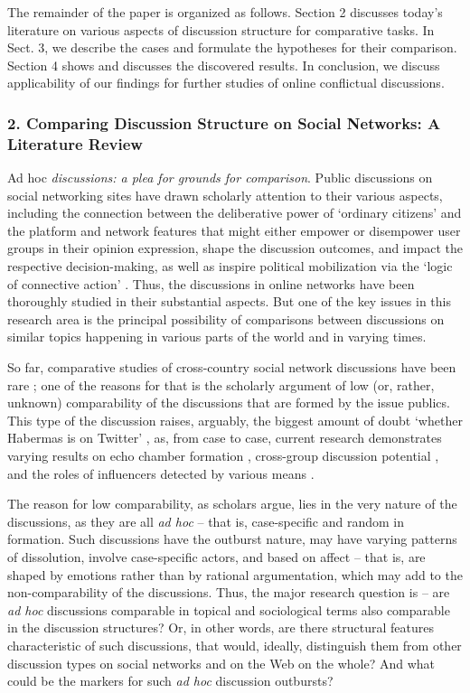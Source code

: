 The remainder of the paper is organized as follows. Section 2 discusses today’s literature on various aspects of discussion structure for comparative tasks. In Sect. 3, we describe the cases and formulate the hypotheses for their comparison. Section 4 shows and discusses the discovered results. In conclusion, we discuss applicability of our findings for further studies of online conflictual discussions.

\subsubsection{2. Comparing Discussion Structure on Social Networks: A Literature Review}

Ad hoc \textit{discussions: a plea for grounds for comparison}. Public discussions on social networking sites have drawn scholarly attention to their various aspects, including the connection between the deliberative power of ‘ordinary citizens’ and the platform and network features that might either empower or disempower user groups in their opinion expression, shape the discussion outcomes, and impact the respective decision-making, as well as inspire political mobilization via the ‘logic of connective action’ \cite{BennettSegerberg}. Thus, the discussions in online networks have been thoroughly studied in their substantial aspects. But one of the key issues in this research area is the principal possibility of comparisons between discussions on similar topics happening in various parts of the world and in varying times.

So far, comparative studies of cross-country social network discussions have been rare \cite{BodrunovaLitvinenkoBlekanov2017}; one of the reasons for that is the scholarly argument of low (or, rather, unknown) comparability of the discussions that are formed by the issue publics. This type of the discussion raises, arguably, the biggest amount of doubt ‘whether Habermas is on Twitter’ \cite{BrunsHighfeld2016}, as, from case to case, current research demonstrates varying results on echo chamber formation \cite{BastosMerceaBaronchelli,ColleoniRozzaArvidsson,Sunstein2001,YardiBoyd}, cross-group discussion potential \cite{Barbera,BarberaJostNagler}, and the roles of influencers detected by various means \cite{BastosRaimundoTravitzki,BodrunovaLitvinenkoBlekanov2017,DuboisGaffney}.

The reason for low comparability, as scholars argue, lies in the very nature of the discussions, as they are all \textit{ad hoc} -- that is, case-specific and random in formation. Such discussions have the outburst nature, may have varying patterns of dissolution, involve case-specific actors, and based on affect \cite{Papacharissi} -- that is, are shaped by emotions rather than by rational argumentation, which may add to the non-comparability of the discussions. Thus, the major research question is -- are \textit{ad hoc} discussions comparable in topical and sociological terms also comparable in the discussion structures? Or, in other words, are there structural features characteristic of such discussions, that would, ideally, distinguish them from other discussion types on social networks and on the Web on the whole? And what could be the markers for such \textit{ad hoc} discussion outbursts?

